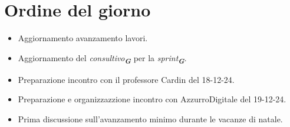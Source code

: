 

\section{Ordine del giorno}

\begin{itemize}
    \item Aggiornamento avanzamento lavori.
    \item Aggiornamento del \emph{consultivo}\textsubscript{\textit{\textbf{G}}} per la \emph{sprint}\textsubscript{\textit{\textbf{G}}}.
    \item Preparazione incontro con il professore Cardin del 18-12-24.
    \item Preparazione e organizzazzione incontro con AzzurroDigitale del 19-12-24.
    \item Prima discussione sull'avanzamento minimo durante le vacanze di natale.
\end{itemize}
